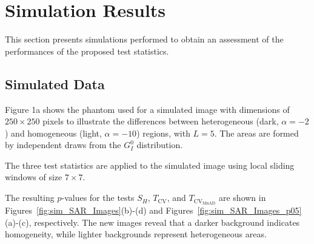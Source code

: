 \documentclass[remotesensing,article,submit,moreauthors,pdftex]{Definitions/mdpi}
\begin{document}
\hypertarget{sec:Results}{%
\section{Simulation Results}\label{sec:Results}}

This section presents simulations performed to obtain an assessment of
the performances of the proposed test statistics.

\hypertarget{simulated-data}{%
\subsection{Simulated Data}\label{simulated-data}}

Figure 1a shows the phantom used for a simulated image with dimensions
of \(250\times 250\) pixels to illustrate the differences between
heterogeneous (dark, \(\alpha=-2\)) and homogeneous (light,
\(\alpha=-10\)) regions, with \(L = 5\). The areas are formed by
independent draws from the \(G^0_I\) distribution.

The three test statistics are applied to the simulated image using local
sliding windows of size \(7\times 7\).

The resulting \(p\)-values for the tests \(S_H\), \(T_{\text{CV}}\), and
\(T_{\text{CV}_{\text{MnAD}}}\) are shown in
Figures~\ref{fig:sim_SAR_Images}(b)-(d) and
Figures~\ref{fig:sim_SAR_Images_p05}(a)-(c), respectively. The new
images reveal that a darker background indicates homogeneity, while
lighter backgrounds represent heterogeneous areas.
\end{document}
